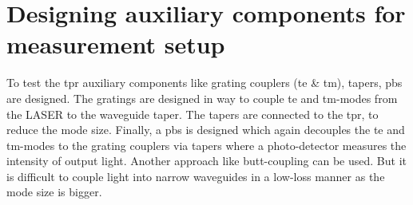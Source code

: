 \documentclass[../report.tex]{subfiles}
\begin{document}
\begin{comment}

		\subsection{Design B: Tapered Si waveguide with horizontal gradual asymmetry on SOI with air cladding based on mode evolution}

\subsubsection{Optimized dimensions of bus waveguide}
		
\begin{figure}[H] %
	\begin{subfigure}[t]{0.45\textwidth}
		\texttt{[image: 3-mode1-200-200]}
		\caption{\gls{te} mode in the cross-section}
		\label{fig:4_mode1_200_200}
	\end{subfigure}
	\hfill
	\begin{subfigure}[t]{0.45\textwidth}
		\texttt{[image: 3-mode2-200-200]}
		\caption{\gls{tm} mode in the cross-section}
		\label{fig:4_mode2_200_200}
	\end{subfigure}
	\caption{Hybrid modes in the cross-section with width = 200nm, height = 220nm, obtained using Comsol 2-D simulation}
\end{figure}

\subsubsection{Optimized dimensions of MEMS waveguide}	

\subsubsection{Device tolerance}

\subsubsection{Representational design based on simulation}
\end{comment}

\section{Designing auxiliary components for measurement setup}
To test the \gls{tpr} auxiliary components like grating couplers (\gls{te} \& \gls{tm}), tapers, \gls{pbs} are designed. The gratings are designed in way to couple \gls{te} and \gls{tm}-modes from the LASER to the waveguide taper. The tapers are connected to the \gls{tpr}, to reduce the mode size. Finally, a \gls{pbs} is designed which again decouples the \gls{te} and \gls{tm}-modes to the grating couplers via tapers where a photo-detector measures the intensity of output light. Another approach like butt-coupling can be used. But it is difficult to couple light into narrow waveguides in a low-loss manner as the mode size is bigger.  
\end{document}
